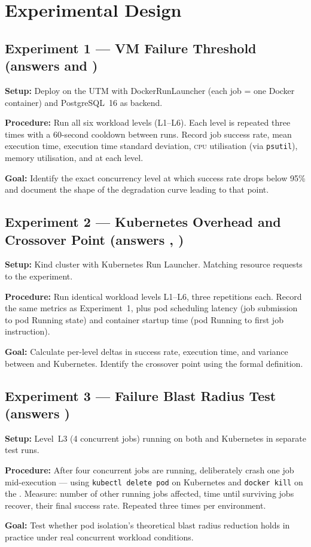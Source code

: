 \section{Experimental Design}

\subsection{Experiment 1 --- VM Failure Threshold (answers  and )}

\textbf{Setup:} Deploy \dagster{} on the UTM \vm{} with DockerRunLauncher (each job = one
Docker container) and PostgreSQL~16 as backend.

\textbf{Procedure:} Run all six workload levels (L1--L6). Each level is repeated three
times with a 60-second cooldown between runs. Record job success rate, mean execution time,
execution time standard deviation, \textsc{cpu} utilisation (via \texttt{psutil}), memory
utilisation, and \mttr{} at each level.

\textbf{Goal:} Identify the exact concurrency level at which success rate drops below 95\%
and document the shape of the degradation curve leading to that point.

\subsection{Experiment 2 --- Kubernetes Overhead and Crossover Point (answers , )}

\textbf{Setup:} Kind cluster with Kubernetes Run Launcher. Matching resource requests to
the \vm{} experiment.

\textbf{Procedure:} Run identical workload levels L1--L6, three repetitions each. Record
the same metrics as Experiment~1, plus pod scheduling latency (job submission to pod
Running state) and container startup time (pod Running to first job instruction).

\textbf{Goal:} Calculate per-level deltas in success rate, execution time, and variance
between \vm{} and Kubernetes. Identify the crossover point using the formal definition.

\subsection{Experiment 3 --- Failure Blast Radius Test (answers )}

\textbf{Setup:} Level~L3 (4 concurrent jobs) running on both \vm{} and Kubernetes in
separate test runs.

\textbf{Procedure:} After four concurrent jobs are running, deliberately crash one job
mid-execution --- using \texttt{kubectl delete pod} on Kubernetes and \texttt{docker kill}
on the \vm{}. Measure: number of other running jobs affected, time until surviving jobs
recover, their final success rate. Repeated three times per environment.

\textbf{Goal:} Test whether pod isolation's theoretical blast radius reduction holds in
practice under real concurrent workload conditions.
